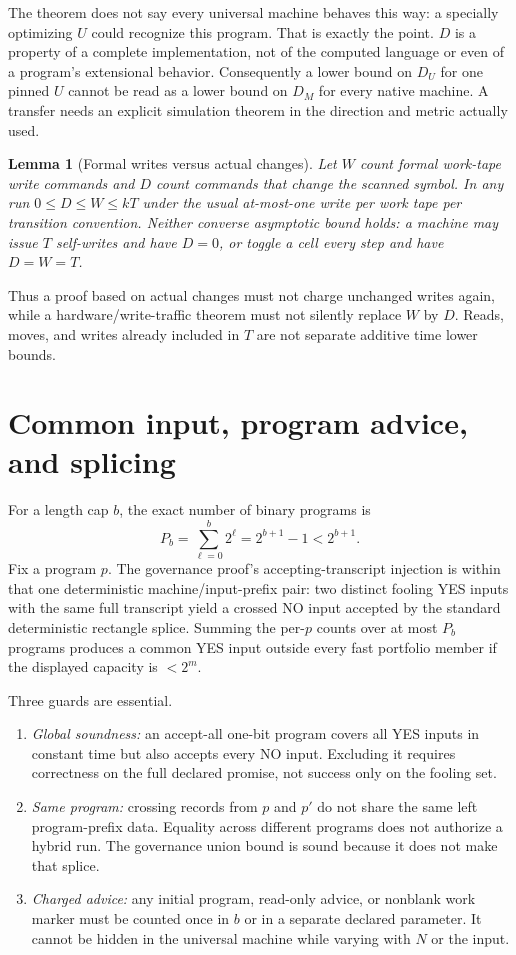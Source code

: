 \documentclass[11pt]{article}
\newtheorem{lemma}[theorem]{Lemma}
\begin{document}
The theorem does not say every universal machine behaves this way: a specially optimizing $U$ could recognize this program.  That is exactly the point.  $D$ is a property of a complete implementation, not of the computed language or even of a program's extensional behavior.  Consequently a lower bound on $D_U$ for one pinned $U$ cannot be read as a lower bound on $D_M$ for every native machine.  A transfer needs an explicit simulation theorem in the direction and metric actually used.

\begin{lemma}[Formal writes versus actual changes]\label{lem:writes}
Let $W$ count formal work-tape write commands and $D$ count commands that change the scanned symbol.  In any run $0\le D\le W\le kT$ under the usual at-most-one write per work tape per transition convention.  Neither converse asymptotic bound holds: a machine may issue $T$ self-writes and have $D=0$, or toggle a cell every step and have $D=W=T$.
\end{lemma}
Thus a proof based on actual changes must not charge unchanged writes again, while a hardware/write-traffic theorem must not silently replace $W$ by $D$.  Reads, moves, and writes already included in $T$ are not separate additive time lower bounds.

\section{Common input, program advice, and splicing}\label{sec:common}
For a length cap $b$, the exact number of binary programs is
\[
P_b=\sum_{\ell=0}^b2^\ell=2^{b+1}-1<2^{b+1}.
\]
Fix a program $p$.  The governance proof's accepting-transcript injection is within that one deterministic machine/input-prefix pair: two distinct fooling YES inputs with the same full transcript yield a crossed NO input accepted by the standard deterministic rectangle splice.  Summing the per-$p$ counts over at most $P_b$ programs produces a common YES input outside every fast portfolio member if the displayed capacity is $<2^m$.

Three guards are essential.
\begin{enumerate}
\item \emph{Global soundness:} an accept-all one-bit program covers all YES inputs in constant time but also accepts every NO input.  Excluding it requires correctness on the full declared promise, not success only on the fooling set.
\item \emph{Same program:} crossing records from $p$ and $p'$ do not share the same left program-prefix data.  Equality across different programs does not authorize a hybrid run.  The governance union bound is sound because it does not make that splice.
\item \emph{Charged advice:} any initial program, read-only advice, or nonblank work marker must be counted once in $b$ or in a separate declared parameter.  It cannot be hidden in the universal machine while varying with $N$ or the input.
\end{enumerate}
\end{document}
